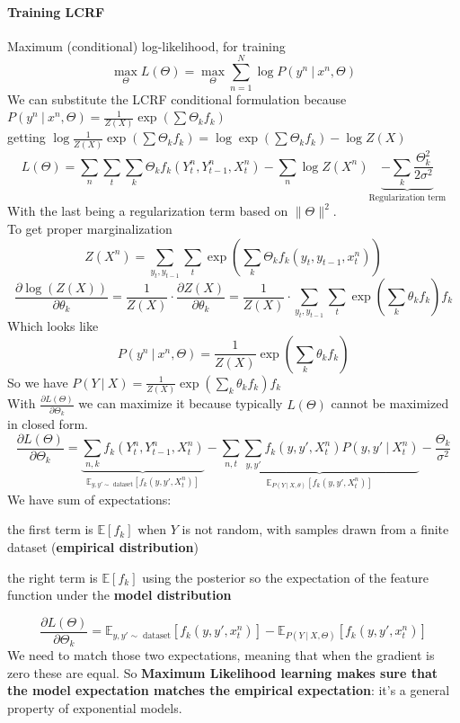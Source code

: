 \documentclass[10pt]{report}
\begin{document}
\paragraph{Training LCRF}Maximum (conditional) log-likelihood, for training $$\max_\Theta L(\Theta) = \max_\Theta\sum_{n=1}^N\log P(y^n\:|\:x^n,\Theta)$$
We can substitute the LCRF conditional formulation because $P(y^n\:|\:x^n,\Theta) = \frac{1}{Z(X)}\exp(\sum \Theta_k f_k)$\\
getting $\log \frac{1}{Z(X)}\exp(\sum \Theta_k f_k) = \log \exp(\sum \Theta_k f_k)-\log Z(X)$
$$L(\Theta)=\sum_n\sum_t\sum_k \Theta_kf_k(Y_t^n,Y_{t-1}^n,X_t^n)-\sum_n\log Z(X^n)\underset{\text{Regularization term}}{\underbrace{-\sum_k\frac{\Theta_k^2}{2\sigma^2}}}$$
With the last being a regularization term based on $\|\Theta\|^2$.\\
To get proper marginalization $$Z(X^n) = \sum_{y_t,y_{t-1}}\sum_t \exp\left(\sum_k\Theta_k f_k(y_t,y_{t-1},x^n_t)\right)$$
$$\frac{\partial\log(Z(X))}{\partial \theta_k} = \frac{1}{Z(X)}\cdot\frac{\partial Z(X)}{\partial \theta_k} = \frac{1}{Z(X)}\cdot\sum_{y_t,y_{t-1}}\sum_t\exp\left(\sum_k\theta_k f_k\right)f_k$$
Which looks like
$$P(y^n\:|\:x^n,\Theta) = \frac{1}{Z(X)}\exp\left(\sum_k\theta_kf_k\right)$$
So we have $P(Y\:|\:X) = \frac{1}{Z(X)}\exp\left(\sum_k\theta_k f_k\right)f_k$\\
With $\frac{\partial L(\Theta)}{\partial \Theta_k}$ we can maximize it because typically $L(\Theta)$ cannot be maximized in closed form.
$$\frac{\partial L(\Theta)}{\partial \Theta_k} = \underset{\mathbb{E}_{y,y'\sim\text{ dataset}}[f_k(y,y',X_t^n)]}{\underbrace{\sum_{n,k}f_k(Y_t^n,Y_{t-1}^n,X_t^n)}}-\underset{\mathbb{E}_{P(Y\:|\:X,\theta)}[f_k(y,y',X_t^n)]}{\underbrace{\sum_{n,t}\sum_{y,y'}f_k(y,y',X_t^n)P(y,y'\:|\:X^n_t)}}-\frac{\Theta_k}{\sigma^2}$$ 
We have sum of expectations:
\begin{list}{}{}
	\item the first term is $\mathbb{E}[f_k]$ when $Y$ is not random, with samples drawn from a finite dataset (\textbf{empirical distribution})
	\item the right term is $\mathbb{E}[f_k]$ using the posterior so the expectation of the feature function under the \textbf{model distribution}
\end{list}
$$\frac{\partial L(\Theta)}{\partial \Theta_k} = \mathbb{E}_{y,y'\sim\text{ dataset}}[f_k(y,y',x^n_t)] - \mathbb{E}_{P(Y\:|\:X,\Theta)}[f_k(y,y',x_t^n)]$$
We need to match those two expectations, meaning that when the gradient is zero these are equal. So \textbf{Maximum Likelihood learning makes sure that the model expectation matches the empirical expectation}: it's a general property of exponential models.\\
\end{document}
